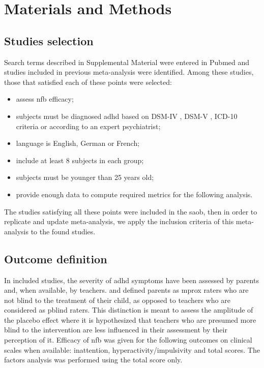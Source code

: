 

\section{Materials and Methods}

\subsection{Studies selection}

Search terms described in Supplemental Material were entered in Pubmed and studies included in previous meta-analysis were identified. Among these studies, those that
satisfied each of these points were selected:
\begin{itemize}
	\item assess \gls{nfb} efficacy; 
	\item subjects must be diagnosed \gls{adhd} based on DSM-IV \citep{DSM-4}, DSM-V \citep{DSM-5}, ICD-10 \citep{ICD101993} 
	criteria or according to an expert psychiatrist; 
	\item language is English, German or French;
	\item include at least 8 subjects in each group;
	\item subjects must be younger than 25 years old;
	\item provide enough data to compute required metrics for the following analysis.
\end{itemize} 
The studies satisfying all these points were included in the \gls{saob}, then in order to replicate and 
update \citeauthor{Cortese2016} meta-analysis, we apply the inclusion criteria of this meta-analysis to the found studies. 

\subsection{Outcome definition} 

In included studies, the severity of \gls{adhd} symptoms have been assessed by parents and, when available, by teachers. \citet{Cortese2016} 
and \citet{Micoulaud2014} defined parents as \gls{mprox} raters who are not blind to the treatment of their child, as opposed to 
teachers who are considered as \gls{pblind} raters. This distinction is meant to assess the amplitude of the placebo effect where 
it is hypothesized that teachers who are presumed more blind to the intervention are less influenced in their assessment by their perception of it. 
Efficacy of \gls{nfb} was given for the following outcomes on clinical scales when available: inattention, 
hyperactivity/impulsivity and total scores. The factors analysis was performed using the total score only.

